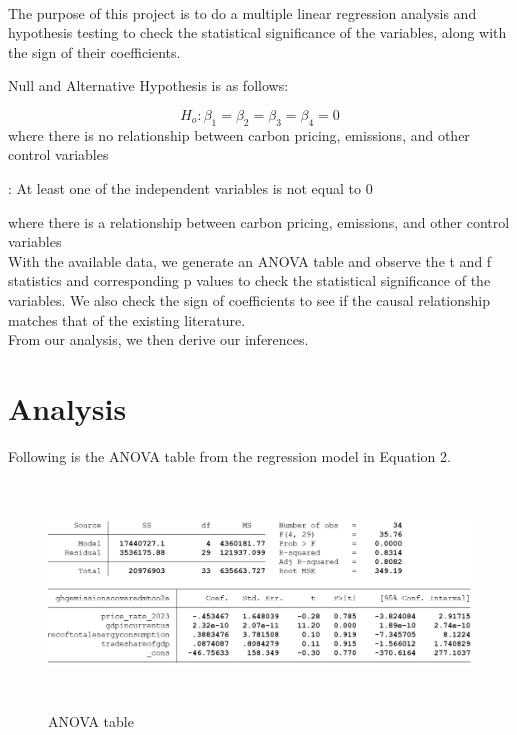 \documentclass[12pt]{article}
\begin{document}
\paragraph{}
The purpose of this project is to do a multiple linear regression analysis and hypothesis testing to check the statistical significance of the variables, along with the sign of their coefficients.
\newpage
\begin{center}Null and Alternative Hypothesis is as follows:\end{center}
\begin{equation*}
    \text{$H_{o}$}: \beta_{1}=\beta_{2}=\beta_{3}=\beta_{4}=0
\end{equation*}
where there is no relationship between carbon pricing, emissions, and other control variables
\begin{center}
    : At least one of the independent variables is not equal to 0 
\end{center}
where there is a relationship between carbon pricing, emissions, and other control variables
\\With the available data, we generate an ANOVA table and observe the t and f statistics and corresponding p values to check the statistical significance of the variables. We also check the sign of coefficients to see if the causal relationship matches that of the existing literature. 
\\From our analysis, we then derive our inferences. 


\section{Analysis}


Following is the ANOVA table from the regression model in Equation 2.
\begin{figure}[H]
    \centering
    \includegraphics[width=16cm,height=6cm]{ANOVA/3.png} 
    \caption{ANOVA table}
\end{figure}
\end{document}

